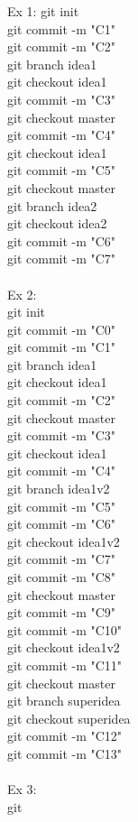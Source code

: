 \documentclass[../main.tex]{subfiles}
\begin{document}
Ex 1: 
git init\\
git commit -m "C1"\\
git commit -m "C2"\\
git branch idea1\\
git checkout idea1\\
git commit -m "C3"\\
git checkout master\\
git commit -m "C4"\\
git checkout idea1\\
git commit -m "C5"\\
git checkout master\\
git branch idea2\\
git checkout idea2\\
git commit -m "C6"\\
git commit -m "C7"\\
\\
Ex 2:\\
git init\\
git commit -m "C0"\\
git commit -m "C1"\\
git branch idea1\\
git checkout idea1\\
git commit -m "C2"\\
git checkout master\\
git commit -m "C3"\\
git checkout idea1\\
git commit -m "C4"\\
git branch idea1v2\\
git commit -m "C5"\\
git commit -m "C6"\\
git checkout idea1v2\\
git commit -m "C7"\\
git commit -m "C8"\\
git checkout master\\
git commit -m "C9"\\
git commit -m "C10"\\
git checkout idea1v2\\
git commit -m "C11"\\
git checkout master\\
git branch superidea\\
git checkout superidea\\
git commit -m "C12"\\
git commit -m "C13"\\
\\
Ex 3:\\
git 
\end{document}
